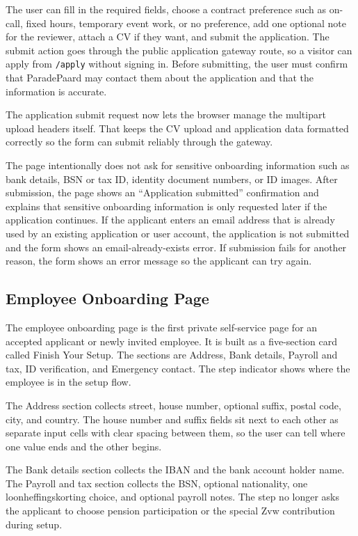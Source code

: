 \documentclass[11pt]{article}
\newcommand{\code}[1]{\nolinkurl{#1}}
\begin{document}
The user can fill in the required fields, choose a contract preference such as on-call, fixed hours, temporary event work, or no preference, add one optional note for the reviewer, attach a CV if they want, and submit the application. The submit action goes through the public application gateway route, so a visitor can apply from \code{/apply} without signing in. Before submitting, the user must confirm that ParadePaard may contact them about the application and that the information is accurate.

The application submit request now lets the browser manage the multipart upload headers itself. That keeps the CV upload and application data formatted correctly so the form can submit reliably through the gateway.

The page intentionally does not ask for sensitive onboarding information such as bank details, BSN or tax ID, identity document numbers, or ID images. After submission, the page shows an ``Application submitted'' confirmation and explains that sensitive onboarding information is only requested later if the application continues. If the applicant enters an email address that is already used by an existing application or user account, the application is not submitted and the form shows an email-already-exists error. If submission fails for another reason, the form shows an error message so the applicant can try again.

\subsection{Employee Onboarding Page}

The employee onboarding page is the first private self-service page for an accepted applicant or newly invited employee. It is built as a five-section card called Finish Your Setup. The sections are Address, Bank details, Payroll and tax, ID verification, and Emergency contact. The step indicator shows where the employee is in the setup flow.

The Address section collects street, house number, optional suffix, postal code, city, and country. The house number and suffix fields sit next to each other as separate input cells with clear spacing between them, so the user can tell where one value ends and the other begins.

The Bank details section collects the IBAN and the bank account holder name. The Payroll and tax section collects the BSN, optional nationality, one loonheffingskorting choice, and optional payroll notes. The step no longer asks the applicant to choose pension participation or the special Zvw contribution during setup.
\end{document}
